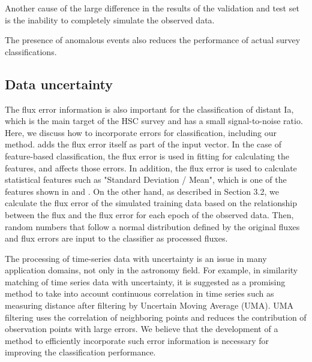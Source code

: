 \documentclass[useamsfonts]{pasj01}
\begin{document}
Another cause of the large difference in the results of the validation and test set is the inability to completely simulate the observed data.

The presence of anomalous events also reduces the performance of actual survey classifications.

%
\subsection{Data uncertainty}
%
The flux error information is also important for the classification of distant Ia, which is the main target of the HSC survey and has a small signal-to-noise ratio.
Here, we discuss how to incorporate errors for classification, including our method.
\citet{charnock17a} adds the flux error itself as part of the input vector.
In the case of feature-based classification, the flux error is used in fitting for calculating the features, and affects those errors.
In addition, the flux error is used to calculate statistical features such as "Standard Deviation / Mean", which is one of the features shown in \citet{narayan18a} and \citet{Muthukrishna_2019}.
On the other hand, as described in Section 3.2, we calculate the flux error of the simulated training data based on the relationship between the flux and the flux error for each epoch of the observed data.
Then, random numbers that follow a normal distribution defined by the original fluxes and flux errors are input to the classifier as processed fluxes.

The processing of time-series data with uncertainty is an issue in many application domains, not only in the astronomy field.
For example, in similarity matching of time series data with uncertainty, it is suggested as a promising method to take into account continuous correlation in time series such as measuring distance after filtering by Uncertain Moving Average (UMA)\citep{Dallachiesa_2012}.
UMA filtering uses the correlation of neighboring points and reduces the contribution of observation points with large errors.
We believe that the development of a method to efficiently incorporate such error information is necessary for improving the classification performance.
%
\end{document}
